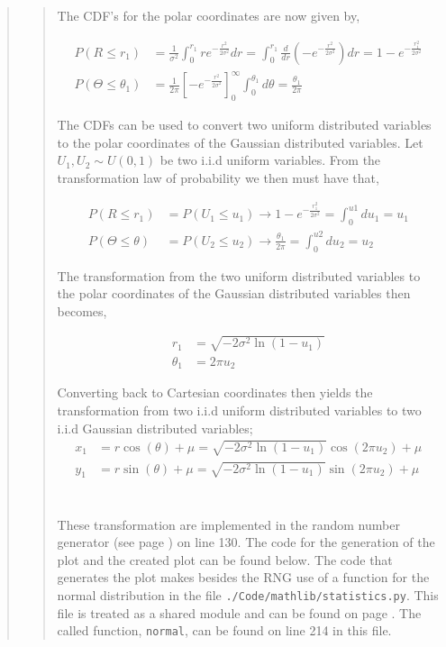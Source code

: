 \begin{quote}
\begin{quote}
The CDF's  for the polar coordinates are now given by, %

\begin{align}
P(R \leq r_1) &= \frac{1}{\sigma^2} \int_{0}^{r_1}  re^{ -\frac{r^2}{2 \sigma ^2} } dr =  \int_{0}^{r_1} \frac{d}{dr} \left( -e^{ -\frac{r^2}{2 \sigma ^2}}  \right) dr = 1 - e^{- \frac{r_1^2}{2 \sigma^2}} \\
P(\Theta \leq \theta_1) &= \frac{1}{2 \pi }  \left[ -e^{-\frac{r^2}{2 \sigma^2}} \right]^{\infty}_{0} \int_{0}^{\theta_1} d\theta = \frac{\theta_1}{2\pi}
\end{align}

The CDFs can be used to convert  two uniform distributed variables to the polar coordinates of the Gaussian distributed variables. Let $U_1, U_2 \sim U(0,1)$ be two i.i.d uniform variables. From the transformation law of probability we then must have that, %

\begin{align}
P(R \leq r_1) &= P(U_1 \leq u_1) \rightarrow  1 - e^{- \frac{r_1^2}{2\sigma^2}}  = \int_{0}^{u1} du_1 = u_1 \\
P(\Theta \leq \theta) &= P(U_2 \leq u_2) \rightarrow   \frac{\theta_1}{2\pi} = \int_{0}^{u2} du_2 = u_2 
\end{align}

The transformation from the two uniform distributed variables to the polar coordinates of the Gaussian distributed variables then becomes,

\begin{align}
r_1 &=  \sqrt{-2\sigma^2 \ln(1 - u_1)} \\
\theta_1 &= 2 \pi u_2
\end{align}

Converting back to Cartesian coordinates then yields the transformation from two i.i.d uniform distributed variables to two i.i.d Gaussian distributed variables;
\begin{align}
x_1 &= r\cos(\theta) + \mu = \sqrt{-2\sigma^2 \ln(1 - u_1)} \cos( 2 \pi u_2 ) + \mu \\
y_1 &= r\sin(\theta) + \mu = \sqrt{-2\sigma^2 \ln(1 - u_1)} \sin( 2 \pi u_2 ) + \mu
\label{EQ:boxmuller}
\end{align}
\\
\\
These transformation are implemented in  the random number generator (see page \pageref{CODE:RNG}) on line 130.  The code for the generation of the plot and the created plot can be found below. The code that generates the plot makes besides the RNG use of a function for the normal distribution in the file \texttt{./Code/mathlib/statistics.py}. This file is treated as a shared module and can be found on page \pageref{CODE:Statistics}. The called function, \texttt{normal}, can be found on line 214 in this file.



\end{quote}
\end{quote}
